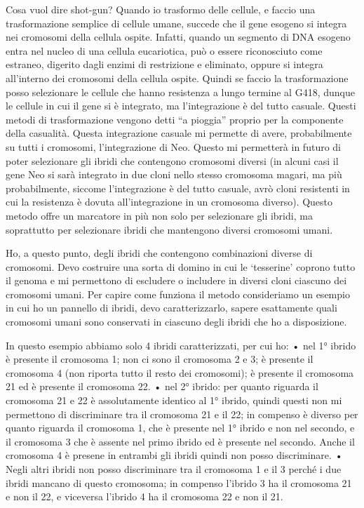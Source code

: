 \documentclass[11pt]{book}
\begin{document}
Cosa vuol dire shot-gun? 
Quando io trasformo delle cellule, e faccio una trasformazione semplice di cellule umane, succede che il gene esogeno si integra nei cromosomi della cellula ospite. Infatti, quando un segmento di DNA esogeno entra nel nucleo di una cellula eucariotica, può o essere riconosciuto come estraneo, digerito dagli enzimi di restrizione e eliminato, oppure si integra all’interno dei cromosomi della cellula ospite. 
Quindi se faccio la trasformazione posso selezionare le cellule che hanno resistenza a lungo termine al G418, dunque le cellule in cui il gene si è integrato, ma l’integrazione è del tutto casuale. Questi metodi di trasformazione vengono detti “a pioggia” proprio per la componente della casualità.
Questa integrazione casuale mi permette di avere, probabilmente su tutti i cromosomi, l’integrazione di Neo. Questo mi permetterà in futuro di poter selezionare gli ibridi che contengono cromosomi diversi (in alcuni casi il gene Neo si sarà integrato in due cloni nello stesso cromosoma magari, ma più probabilmente, siccome l’integrazione è del tutto casuale, avrò cloni resistenti in cui la resistenza è dovuta all’integrazione in un cromosoma diverso). Questo metodo offre un marcatore in più non solo per selezionare gli ibridi, ma soprattutto per selezionare ibridi che mantengono diversi cromosomi umani.

Ho, a questo punto, degli ibridi che contengono combinazioni diverse di cromosomi. Devo costruire una sorta di domino in cui le ‘tesserine’ coprono tutto il genoma e mi permettono di escludere o includere in diversi cloni ciascuno dei cromosomi umani. 
Per capire come funziona il metodo consideriamo un esempio in cui ho un pannello di ibridi, devo caratterizzarlo, sapere esattamente quali cromosomi umani sono conservati in ciascuno degli ibridi che ho a disposizione.


In questo esempio abbiamo solo 4 ibridi caratterizzati, per cui ho:
    • nel 1° ibrido è presente il cromosoma 1; non ci sono il cromosoma 2 e 3; è presente il cromosoma 4 (non riporta tutto il resto dei cromosomi); è presente il cromosoma 21 ed è presente il cromosoma 22.
    • nel 2° ibrido: per quanto riguarda il cromosoma 21 e 22 è assolutamente identico al 1° ibrido, quindi questi non mi permettono di discriminare tra il cromosoma 21 e il 22; in compenso è diverso per quanto riguarda il cromosoma 1, che è presente nel 1° ibrido e non nel secondo, e il cromosoma 3 che è assente nel primo ibrido ed è presente nel secondo. Anche il cromosoma 4 è presene in entrambi gli ibridi quindi non posso discriminare.
    • Negli altri ibridi non posso discriminare tra il cromosoma 1 e il 3 perché i due ibridi mancano di questo cromosoma; in compenso l’ibrido 3 ha il cromosoma 21 e non il 22, e viceversa l’ibrido 4 ha il cromosoma 22 e non il 21.
\end{document}

